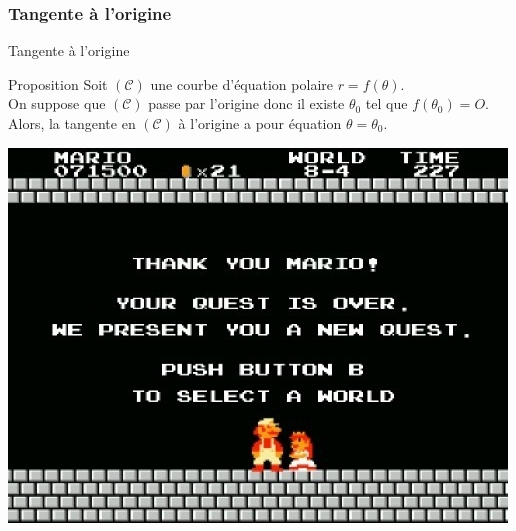 \documentclass[14pt]{beamer}
\begin{document}
\subsubsection{Tangente à l'origine}
\begin{frame}{Tangente à l'origine}
        \begin{alertblock}{Proposition}
                Soit $(\mathcal{C})$ une courbe d'équation polaire $r=f(\theta)$.\\
                On suppose que $(\mathcal{C})$ passe par l'origine donc il existe $\theta_0$
                tel que $f(\theta_0)=O$.
                Alors, la tangente en $(\mathcal{C})$ à l'origine a pour équation $\theta=\theta_0$.
        \end{alertblock}
\end{frame}
\begin{frame}
        \includegraphics[height=\textheight]{images/mario.jpg}
\end{frame}
\end{document}
